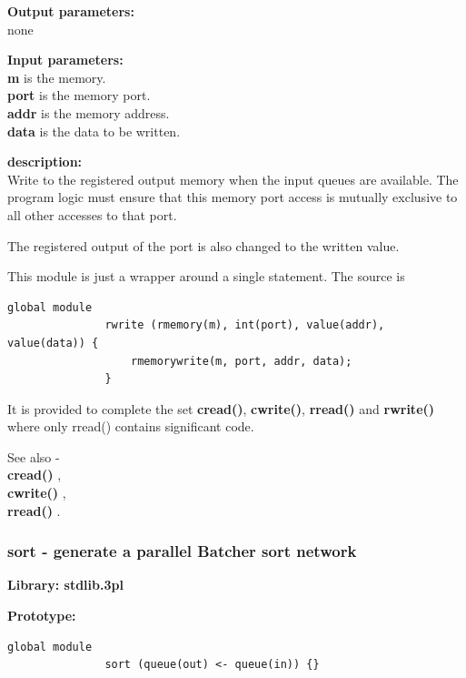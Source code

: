             {\bf Output parameters:} \\
            none

            {\bf Input parameters:} \\
            {\bf m} is the memory.\\
            {\bf port} is the memory port.\\
            {\bf addr} is the memory address.\\            
            {\bf data} is the data to be written.

            {\bf description:} \\
            Write to the registered output memory when the input queues are
            available. The program logic must ensure that this memory port
            access is mutually exclusive to all other accesses to that port.

            The registered output of the port is also changed to the written
            value.
            
            This module is just a wrapper around a single statement. The source
            is
            \begin{lstlisting}[gobble=12, language=threepl]
               global module
               rwrite (rmemory(m), int(port), value(addr), value(data)) {
                   rmemorywrite(m, port, addr, data);
               }
            \end{lstlisting}
                        
            It is provided to complete the set {\bf cread()}, {\bf cwrite()},
            {\bf rread()} and {\bf rwrite()} where only rread() contains
            significant code.
            
            See also - \\
            {\bf cread()} , \\
            {\bf cwrite()} , \\
            {\bf rread()} .


        \subsubsection{sort - generate a parallel Batcher sort network}\label{sec:lmsort}

            {\bf Library: stdlib.3pl}

            {\bf Prototype:} \\
            \vsp
            \begin{lstlisting}[gobble=12, language=threepl]
               global module
               sort (queue(out) <- queue(in)) {}
            \end{lstlisting}

